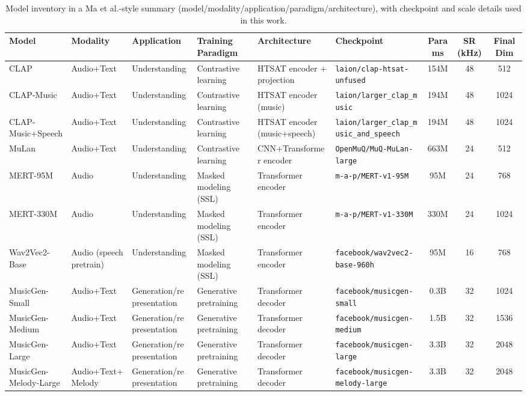 \begin{table}[t]
\centering
\scriptsize
\begin{tabular}{lllp{2.0cm}lp{2.3cm}ccc}
\hline
\textbf{Model} & \textbf{Modality} & \textbf{Application} & \textbf{Training Paradigm} & \textbf{Architecture} & \textbf{Checkpoint} & \textbf{Params} & \textbf{SR (kHz)} & \textbf{Final Dim} \\
\hline
CLAP & Audio+Text & Understanding & Contrastive learning & HTSAT encoder + projection & \texttt{laion/clap-htsat-unfused} & 154M & 48 & 512 \\
CLAP-Music & Audio+Text & Understanding & Contrastive learning & HTSAT encoder (music) & \texttt{laion/larger\_clap\_music} & 194M & 48 & 1024 \\
CLAP-Music+Speech & Audio+Text & Understanding & Contrastive learning & HTSAT encoder (music+speech) & \texttt{laion/larger\_clap\_music\_and\_speech} & 194M & 48 & 1024 \\
MuLan & Audio+Text & Understanding & Contrastive learning & CNN+Transformer encoder & \texttt{OpenMuQ/MuQ-MuLan-large} & 663M & 24 & 512 \\
MERT-95M & Audio & Understanding & Masked modeling (SSL) & Transformer encoder & \texttt{m-a-p/MERT-v1-95M} & 95M & 24 & 768 \\
MERT-330M & Audio & Understanding & Masked modeling (SSL) & Transformer encoder & \texttt{m-a-p/MERT-v1-330M} & 330M & 24 & 1024 \\
Wav2Vec2-Base & Audio (speech pretrain) & Understanding & Masked modeling (SSL) & Transformer encoder & \texttt{facebook/wav2vec2-base-960h} & 95M & 16 & 768 \\
MusicGen-Small & Audio+Text & Generation/representation & Generative pretraining & Transformer decoder & \texttt{facebook/musicgen-small} & 0.3B & 32 & 1024 \\
MusicGen-Medium & Audio+Text & Generation/representation & Generative pretraining & Transformer decoder & \texttt{facebook/musicgen-medium} & 1.5B & 32 & 1536 \\
MusicGen-Large & Audio+Text & Generation/representation & Generative pretraining & Transformer decoder & \texttt{facebook/musicgen-large} & 3.3B & 32 & 2048 \\
MusicGen-Melody-Large & Audio+Text+Melody & Generation/representation & Generative pretraining & Transformer decoder & \texttt{facebook/musicgen-melody-large} & 3.3B & 32 & 2048 \\
\hline
\end{tabular}
\caption{Model inventory in a Ma et al.-style summary (model/modality/application/paradigm/architecture), with checkpoint and scale details used in this work.}
\label{tab:model_inventory}
\end{table}

